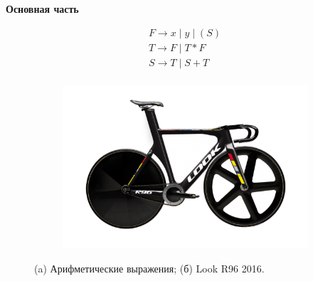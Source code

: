 \documentclass[oneside,a4paper,14pt,final]{extreport}
\begin{document}

\thispagestyle{empty} %

\tableofcontents


\newpage
\vspace*{11cm}
\centerline{\LARGE\sc\textbf{Основная часть}}
\thispagestyle{empty} %






\begin{figure}[ht]
\centering
    \begin{subfigure}[b]{0.3\textwidth}
    \centering
        $$\begin{array}{l}
        F \to x \;|\; y \;|\; (S) \\
        T \to F \;|\; T \ast F \\
        S \to T \;|\; S + T \\
        \end{array}$$
        \caption{}
    \end{subfigure} %
    \begin{subfigure}[b]{0.6\textwidth}
    \centering
        \includegraphics[scale=0.5]{look-track.png}
        \caption{}
    \end{subfigure}

    \caption{(a) Арифметические выражения;
             (б) Look R96 2016.}
    \label{fig_parsetree}
\end{figure}
\end{document}
